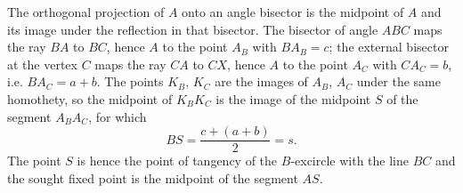 {    The orthogonal projection of $A$ onto an angle bisector is the midpoint of $A$ and its image under the reflection in that bisector. The bisector of angle $ABC$ maps the ray $BA$ to $BC$, hence $A$ to the point $A_B$ with $BA_B = c$; the external bisector at the vertex $C$ maps the ray $CA$ to $CX$, hence $A$ to the point $A_C$ with $CA_C = b$, i.e. $BA_C = a+b$. The points $K_B$, $K_C$ are the images of $A_B$, $A_C$ under the same homothety, so the midpoint of $K_BK_C$ is the image of the midpoint $S$ of the segment $A_BA_C$, for which
    $$
    BS = \frac{c + (a+b)}{2} = s.
    $$
    The point $S$ is hence the point of tangency of the $B$-excircle with the line $BC$ and the sought fixed point is the midpoint of the segment $AS$.
}

\DisplayHints

\DisplayProblemSolutions

\bye
